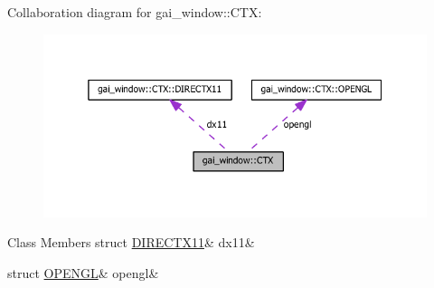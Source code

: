 Collaboration diagram for gai\+\_\+window\+:\+:C\+TX\+:
\nopagebreak
\begin{figure}[H]
\begin{center}
\leavevmode
\includegraphics[width=338pt]{uniongai__window_1_1_c_t_x__coll__graph}
\end{center}
\end{figure}
\begin{DoxyFields}{Class Members}
\mbox{\label{structgai__window_a2112189a9a1bc9b668a7c75a5527a52d}} 
struct \hyperlink{structgai__window_structgai__window_1_1_c_t_x_1_1_d_i_r_e_c_t_x11}{DIRECTX11}&
dx11&
\\
\hline

\mbox{\label{structgai__window_a2b95d5e69bdf2e65fa3bafc4061d0ec7}} 
struct \hyperlink{structgai__window_structgai__window_1_1_c_t_x_1_1_o_p_e_n_g_l}{OPENGL}&
opengl&
\\
\hline

\end{DoxyFields}
\label{structgai__window_1_1_i_n_p_u_t}

